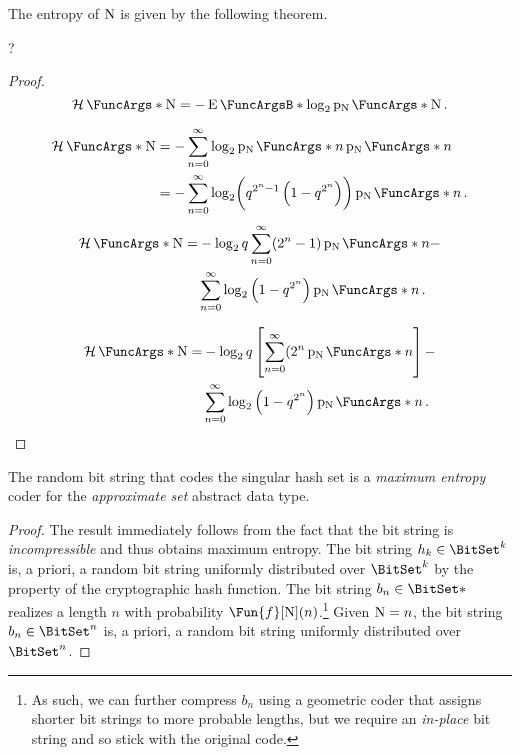 \documentclass[ ../main.tex]{subfiles}
\begin{document}
The entropy of $\mathrm{N}$ is given by the following theorem.
\begin{theorem}
    ?
\end{theorem}
\begin{proof}
    \begin{equation}
        \Entropy{\RV{N}} = -\Expect{\log_2 \PDF{\RV{N}}[\RV{N}]}\,.
    \end{equation}
    
    \begin{align}
        \Entropy{\RV{N}}
        &= -\sum_{n=0}^{\infty} \log_2 \PDF{n}[\RV{N}] \PDF{n}[\RV{N}]\\
        &= -\sum_{n=0}^{\infty} \log_2\! \left(q^{2^n-1}\left(1-q^{2^n}\right)\right) \PDF{n}[\RV{N}]\,.
    \end{align}
    \begin{equation}
        \begin{split}
            \Entropy{\RV{N}}
            =&-\log_2 q \sum_{n=0}^{\infty}
            (2^n-1) \PDF{n}[\RV{N}] -\\
            &\sum_{n=0}^{\infty} \log_2\left(1-q^{2^n}\right) \PDF{n}[\RV{N}]\,.
        \end{split}
    \end{equation}
    
    \begin{equation}
        \begin{split}
            \Entropy{\RV{N}}
            =&-\log_2 q \left[\sum_{n=0}^{\infty}
            (2^n \PDF{n}[\RV{N}]\right] -\\
            &\sum_{n=0}^{\infty} \log_2\left(1-q^{2^n}\right) \PDF{n}[\RV{N}]\,.
        \end{split}
    \end{equation}
\end{proof}


\begin{theorem}
    The random bit string that codes the singular hash set is a \emph{maximum entropy} coder for the \emph{approximate set} abstract data type.
\end{theorem}
\begin{proof}
    The result immediately follows from the fact that the bit string is \emph{incompressible} and thus obtains maximum entropy.
    The bit string $h_k \in \BitSet^k$ is, a priori, a random bit string uniformly distributed over $\BitSet^k$ by the property of the cryptographic hash function.
    The bit string $b_n \in \BitSet*$ realizes a length $n$ with probability $\Fun{f}[\RV{N}](n)$.\footnote{As such, we can further compress $b_n$ using a geometric coder that assigns shorter bit strings to more probable lengths, but we require an \emph{in-place} bit string and so stick with the original code.}
    Given $\mathrm{N}=n$, the bit string $b_n \in \BitSet^n$ is, a priori, a random bit string uniformly distributed over $\BitSet^n$.
\end{proof}
\end{document}
